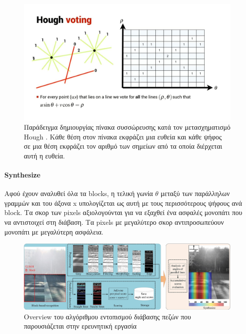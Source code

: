\begin{figure}[H]
    \centering
    \includegraphics[width=\textwidth]{images/hough_transform.jpg}
    \caption{Παράδειγμα δημιουργίας πίνακα συσσώρευσης κατά τον μετασχηματισμό Hough \cite{FindingL66:online}. Κάθε θέση στον πίνακα εκφράζει μια ευθεία και κάθε ψήφος σε μια θέση εκφράζει τον αριθμό των σημείων από τα οποία διέρχεται αυτή η ευθεία.}
    \label{fig:voting-hough}
\end{figure}

\paragraph{Synthesize}\label{synthesize}
Αφού έχουν αναλυθεί όλα τα blocks, η τελική γωνία $\theta$ μεταξύ των παράλληλων γραμμών και του άξονα x υπολογίζεται ως αυτή με τους περισσότερους ψήφους ανά block. Τα σκορ των pixels αξιολογούνται για να εξαχθεί ένα ασφαλές μονοπάτι που να αντιστοιχεί στη διάβαση. Τα pixels με μεγαλύτερο σκορ αντιπροσωπεύουν μονοπάτι με μεγαλύτερη ασφάλεια.

\begin{figure}[H]
    \centering
    \includegraphics[width=\textwidth]{images/flow_hough_paper.jpg}
    \caption{Overview του αλγόριθμου εντοπισμού διάβασης πεζών που παρουσιάζεται στην ερευνητική εργασία \cite{wu_block-based_2019}}
    \label{fig:flow-hough-paper}
\end{figure}

